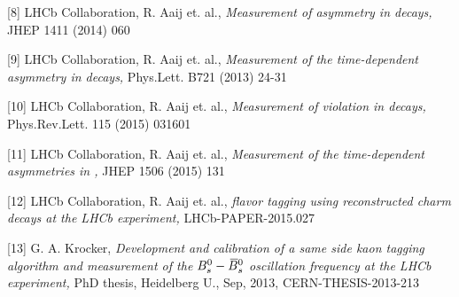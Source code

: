 {\begin{minipage}{0.474\boxwidth}
\vspace{0.10em}
\end{minipage}
\hfill
\begin{minipage}{0.474\boxwidth}
\begin{compactitem}
{\tiny\item[{[8]}] LHCb Collaboration, R. Aaij et. al., {\it Measurement of \CP asymmetry in \BsToDsK decays, } JHEP 1411 (2014) 060}
\end{compactitem}
\begin{compactitem}
{\tiny\item[{[9]}] LHCb Collaboration, R. Aaij et. al., {\it Measurement of the time-dependent \CP asymmetry in \BdToJPsiKS decays, } Phys.Lett. B721 (2013) 24-31}
\end{compactitem}
\begin{compactitem}
{\tiny\item[{[10]}] LHCb Collaboration, R. Aaij et. al., {\it Measurement of \CP violation in \BdToJPsiKS decays, } Phys.Rev.Lett. 115 (2015) 031601}
\end{compactitem}
\begin{compactitem}
{\tiny\item[{[11]}] LHCb Collaboration, R. Aaij et. al., {\it Measurement of the time-dependent \CP asymmetries in \BsToJPsiKS, } JHEP 1506 (2015) 131}
\end{compactitem}
\begin{compactitem}
{\tiny\item[{[12]}] LHCb Collaboration, R. Aaij et. al., {\it \B flavor tagging using reconstructed charm decays at the LHCb experiment, } LHCb-PAPER-2015.027}
\end{compactitem}
\begin{compactitem}
{\tiny\item[{[13]}] G. A. Krocker, {\it Development and calibration of a same side kaon tagging algorithm and measurement of the $B^0_s-\kern 0.18em\overline{\kern -0.18em B}{}^0_s$ oscillation frequency \dms at the LHCb experiment, } PhD thesis, Heidelberg U., Sep, 2013, CERN-THESIS-2013-213}
\end{compactitem}
\vspace{0.10em}
\end{minipage}

}
